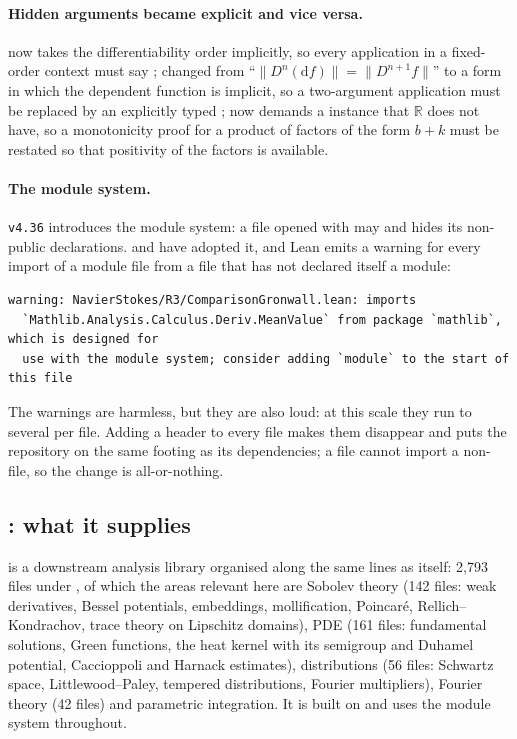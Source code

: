 \paragraph{Hidden arguments became explicit and vice versa.}
 now takes the differentiability order implicitly, so every application
in a fixed-order context must say ; 
changed from ``$\|D^n(\mathrm{d}f)\| = \|D^{n+1}f\|$'' to a form in which the dependent
function is implicit, so a two-argument application must be replaced by an explicitly typed
;  now demands a  instance that
$\mathbb{R}$ does not have, so a monotonicity proof for a product of factors of the form $b+k$
must be restated so that positivity of the factors is available.

\paragraph{The module system.}
\Lean{} \texttt{v4.36} introduces the module system: a file opened with  may
 and hides its non-public declarations. \Mathlib{} and \TauCeti{} have
adopted it, and Lean emits a warning for every import of a module file from a file that has
not declared itself a module:
\begin{lstlisting}
warning: NavierStokes/R3/ComparisonGronwall.lean: imports
  `Mathlib.Analysis.Calculus.Deriv.MeanValue` from package `mathlib`, which is designed for
  use with the module system; consider adding `module` to the start of this file
\end{lstlisting}
The warnings are harmless, but they are also loud: at this scale they run to several per
file. Adding a  header to every file makes them disappear and puts the
repository on the same footing as its dependencies; a  file cannot import a
non- file, so the change is all-or-nothing.

\subsection{\TauCeti{}: what it supplies}
\label{sec:tauceti}

\TauCeti{} is a downstream analysis library organised along the same lines as \Mathlib{}
itself: 2{,}793 files under , of which the areas relevant here are
Sobolev theory (142 files: weak derivatives, Bessel potentials, embeddings, mollification,
Poincaré, Rellich--Kondrachov, trace theory on Lipschitz domains), PDE (161 files:
fundamental solutions, Green functions, the heat kernel with its semigroup and Duhamel
potential, Caccioppoli and Harnack estimates), distributions (56 files: Schwartz space,
Littlewood--Paley, tempered distributions, Fourier multipliers), Fourier theory (42 files)
and parametric integration. It is built on \Mathlib{} and uses the module system throughout.

